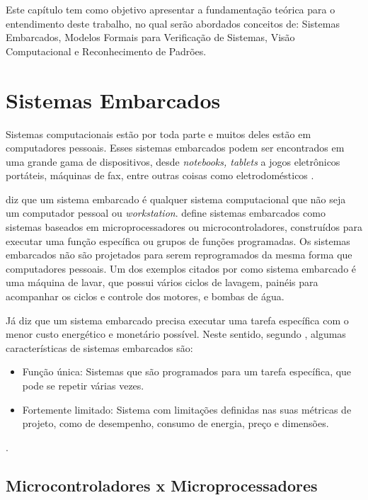 \label{chap:fund_teo}
	Este capítulo tem como objetivo apresentar a fundamentação teórica para o entendimento deste trabalho, no qual serão abordados conceitos de: Sistemas Embarcados, Modelos Formais para Verificação de Sistemas, Visão Computacional e Reconhecimento de Padrões.
  
    
    
\section{Sistemas Embarcados} 

Sistemas computacionais estão por toda parte e muitos deles estão em computadores pessoais. Esses sistemas embarcados podem ser encontrados em uma grande gama de dispositivos, desde \textit{notebooks, tablets} a jogos eletrônicos portáteis, máquinas de fax, entre outras coisas como eletrodomésticos \cite{vahid:2002}.

 diz que um sistema embarcado é qualquer sistema computacional que não seja um computador pessoal ou \textit{workstation}.  define sistemas embarcados como sistemas baseados em microprocessadores ou microcontroladores, construídos para executar uma função específica ou grupos de funções programadas. Os sistemas embarcados não são projetados para serem reprogramados da mesma forma que computadores pessoais.
% 
Um dos exemplos citados por \cite{heath:2002} como sistema embarcado é uma máquina de lavar, que possui vários ciclos de lavagem, painéis para acompanhar os ciclos e controle dos motores, e bombas de água.

Já  diz que um sistema embarcado precisa executar uma tarefa específica com o menor custo energético e monetário possível.
Neste sentido, segundo , algumas características de sistemas embarcados são:\begin{itemize}
\item Função única: Sistemas que são programados para um tarefa específica, que pode se repetir várias vezes.
\item Fortemente limitado: Sistema com limitações definidas nas suas métricas de projeto, como de desempenho, consumo de energia, preço e dimensões.
\end{itemize}


.
 

\subsection{Microcontroladores x Microprocessadores}
        

